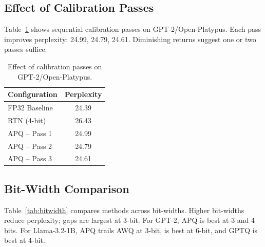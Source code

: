 \documentclass[10pt,twocolumn,letterpaper]{article}
\begin{document}
\subsection{Effect of Calibration Passes}

Table~\ref{tab:passes} shows sequential calibration passes on GPT-2/Open-Platypus. Each pass improves perplexity: 24.99, 24.79, 24.61. Diminishing returns suggest one or two passes suffice.

\begin{table}[h]
\centering
\caption{Effect of calibration passes on GPT-2/Open-Platypus.}
\label{tab:passes}
\small
\begin{tabular}{lc}
\toprule
Configuration & Perplexity \\
\midrule
FP32 Baseline & 24.39 \\
RTN (4-bit) & 26.43 \\
APQ -- Pass 1 & 24.99 \\
APQ -- Pass 2 & 24.79 \\
APQ -- Pass 3 & 24.61 \\
\bottomrule
\end{tabular}
\end{table}

\subsection{Bit-Width Comparison}

Table~\ref{tab:bitwidth} compares methods across bit-widths. Higher bit-widths reduce perplexity; gaps are largest at 3-bit. For GPT-2, APQ is best at 3 and 4 bits. For Llama-3.2-1B, APQ trails AWQ at 3-bit, is best at 6-bit, and GPTQ is best at 4-bit.

\begin{table}[h]
\centering
\caption{Bit-width comparison on Open-Platypus}
\label{tab:bitwidth}
\small
{}
\end{table}
\end{document}
